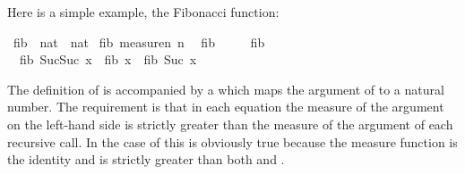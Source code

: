 %
\begin{isabellebody}%
\def\isabellecontext{examples}%
%
\begin{isamarkuptext}%
Here is a simple example, the Fibonacci function:%
\end{isamarkuptext}%
\ fib\ {\isacharcolon}{\isacharcolon}\ {\isachardoublequote}nat\ {\isasymRightarrow}\ nat{\isachardoublequote}\isanewline
{}\ fib\ {\isachardoublequote}measure{\isacharparenleft}{\isasymlambda}n{\isachardot}\ n{\isacharparenright}{\isachardoublequote}\isanewline
\ \ {\isachardoublequote}fib\ {}\ {\isacharequal}\ {}{\isachardoublequote}\isanewline
\ \ {\isachardoublequote}fib\ {}\ {\isacharequal}\ {}{\isachardoublequote}\isanewline
\ \ {\isachardoublequote}fib\ {\isacharparenleft}Suc{\isacharparenleft}Suc\ x{\isacharparenright}{\isacharparenright}\ {\isacharequal}\ fib\ x\ {\isacharplus}\ fib\ {\isacharparenleft}Suc\ x{\isacharparenright}{\isachardoublequote}%
\begin{isamarkuptext}%
\noindent
The definition of  is accompanied by a 
 which maps the argument of  to a
natural number. The requirement is that in each equation the measure of the
argument on the left-hand side is strictly greater than the measure of the
argument of each recursive call. In the case of  this is
obviously true because the measure function is the identity and
 is strictly greater than both  and
.


\end{isamarkuptext}
\end{isabellebody}
